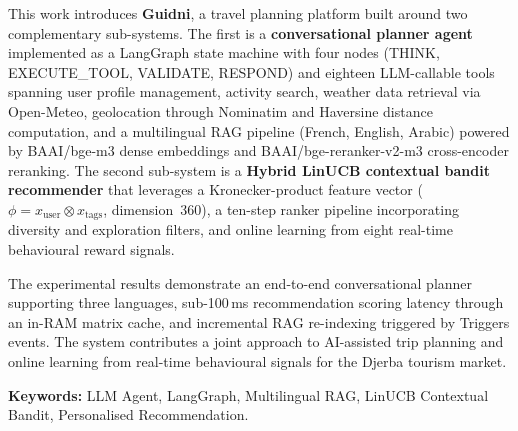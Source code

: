 This work introduces \textbf{Guidni}, a travel planning platform built
around two complementary sub-systems. The first is a \textbf{conversational
planner agent} implemented as a LangGraph state machine with four nodes
(THINK, EXECUTE\_TOOL, VALIDATE, RESPOND) and eighteen LLM-callable tools
spanning user profile management, activity search, weather data retrieval via
Open-Meteo, geolocation through Nominatim and Haversine distance
computation, and a multilingual RAG pipeline (French, English, Arabic)
powered by BAAI/bge-m3 dense embeddings and BAAI/bge-reranker-v2-m3
cross-encoder reranking. The second sub-system is a \textbf{Hybrid LinUCB
contextual bandit recommender} that leverages a Kronecker-product feature
vector ($\phi = x_{\text{user}} \otimes x_{\text{tags}}$, dimension~360), a
ten-step ranker pipeline incorporating diversity and exploration filters, and
online learning from eight real-time behavioural reward signals.

The experimental results demonstrate an end-to-end conversational planner
supporting three languages, sub-100\,ms recommendation scoring latency
through an in-RAM matrix cache, and incremental RAG re-indexing triggered by
Triggers events. The system contributes a joint approach to
AI-assisted trip planning and online learning from real-time behavioural
signals for the Djerba tourism market.

\vspace{0.8cm}
\noindent\textbf{Keywords:} LLM Agent, LangGraph, Multilingual RAG, LinUCB
Contextual Bandit, Personalised Recommendation.


